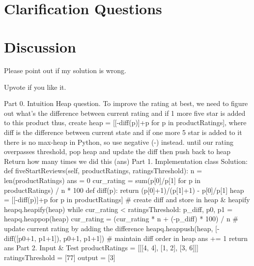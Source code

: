 \begin{example}
	\hfill \
	
\end{example}

\section{Clarification Questions}




\begin{QandA}
	\item 
	\begin{answered}
		\textit{}
	\end{answered}
	
\end{QandA}

\section{Discussion}
\label{five_starts_seller:sec:discussion}

Please point out if my solution is wrong.

Upvote if you like it.

Part 0. Intuition
Heap question. To improve the rating at best, we need to figure out what's the difference between current rating and if 1 more five star is added to this product
thus, create heap = [[-diff(p)]+p for p in productRatings], where diff is the difference between current state and if one more 5 star is added to it
there is no max-heap in Python, so use negative (-) instead.
until our rating overpasses threshold, pop heap and update the diff then push back to heap
Return how many times we did this (ans)
Part 1. Implementation
class Solution:
    def fiveStartReviews(self, productRatings, ratingsThreshold):
        n = len(productRatings)
        ans = 0
        cur_rating = sum(p[0]/p[1] for p in productRatings) / n * 100
        def diff(p): return (p[0]+1)/(p[1]+1) - p[0]/p[1]
        heap = [[-diff(p)]+p for p in productRatings]                     # create diff and store in heap & heapify
        heapq.heapify(heap)
        while cur_rating < ratingsThreshold:
            p_diff, p0, p1 = heapq.heappop(heap)
            cur_rating = (cur_rating * n + (-p_diff) * 100) / n           # update current rating by adding the difference
            heapq.heappush(heap, [-diff([p0+1, p1+1]), p0+1, p1+1])       # maintain diff order in heap
            ans += 1
        return ans
Part 2. Input & Test
productRatings = [[[4, 4], [1, 2], [3, 6]]]
ratingsThreshold = [77]
output = [3]


